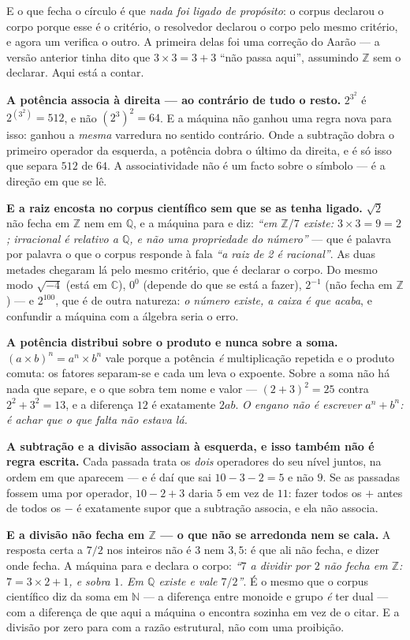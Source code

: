 \documentclass[11pt]{article}
\theoremstyle{plain}
\theoremstyle{remark}
\begin{document}
\begin{itemize}
E o que fecha o círculo é que \emph{nada foi ligado de propósito}: o corpus declarou o corpo
porque esse é o critério, o resolvedor declarou o corpo pelo mesmo critério, e agora um verifica o
outro. A primeira delas foi uma correção do Aarão --- a versão anterior tinha dito que $3\times3 = 3+3$ ``não
passa aqui'', assumindo $\mathbb{Z}$ sem o declarar. Aqui está a contar.

\textbf{A potência associa à direita --- ao contrário de tudo o resto.} $2^{3^2}$ é
$2^{(3^2)} = 512$, e não $(2^3)^2 = 64$. E a máquina não ganhou uma regra nova para isso: ganhou a
\emph{mesma} varredura no sentido contrário. Onde a subtração dobra o primeiro operador da
esquerda, a potência dobra o último da direita, e é só isso que separa $512$ de $64$. A
associatividade não é um facto sobre o símbolo --- é a direção em que se lê.

\textbf{E a raiz encosta no corpus científico sem que se as tenha ligado.} $\sqrt{2}$ não fecha em
$\mathbb{Z}$ nem em $\mathbb{Q}$, e a máquina para e diz: \emph{``em $\mathbb{Z}/7$ existe:
$3\times 3 = 9 = 2$; irracional é relativo a $\mathbb{Q}$, e não uma propriedade do número''} ---
que é palavra por palavra o que o corpus responde à fala \emph{``a raiz de 2 é racional''}. As
duas metades chegaram lá pelo mesmo critério, que é declarar o corpo. Do mesmo modo $\sqrt{-4}$
(está em $\mathbb{C}$), $0^0$ (depende do que se está a fazer), $2^{-1}$ (não fecha em
$\mathbb{Z}$) --- e $2^{100}$, que é de outra natureza: \emph{o número existe, a caixa é que
acaba}, e confundir a máquina com a álgebra seria o erro.

\textbf{A potência distribui sobre o produto e nunca sobre a soma.} $(a\times b)^n = a^n\times b^n$
vale porque a potência \emph{é} multiplicação repetida e o produto comuta: os fatores separam-se e
cada um leva o expoente. Sobre a soma não há nada que separe, e o que sobra tem nome e valor ---
$(2+3)^2 = 25$ contra $2^2+3^2 = 13$, e a diferença $12$ é exatamente $2ab$. \emph{O engano não é
escrever $a^n + b^n$: é achar que o que falta não estava lá.}

\textbf{A subtração e a divisão associam à esquerda, e isso também não é regra escrita.} Cada
passada trata os \emph{dois} operadores do seu nível juntos, na ordem em que aparecem --- e é daí
que sai $10-3-2 = 5$ e não $9$. Se as passadas fossem uma por operador, $10-2+3$ daria $5$ em vez
de $11$: fazer todos os $+$ antes de todos os $-$ é exatamente supor que a subtração associa, e ela
não associa.

\textbf{E a divisão não fecha em $\mathbb{Z}$ --- o que não se arredonda nem se cala.} A resposta
certa a $7/2$ nos inteiros não é $3$ nem $3{,}5$: é que ali não fecha, e dizer onde fecha. A
máquina para e declara o corpo: \emph{``$7$ a dividir por $2$ não fecha em $\mathbb{Z}$:
$7 = 3\times 2 + 1$, e sobra $1$. Em $\mathbb{Q}$ existe e vale $7/2$''}. É o mesmo que o corpus
científico diz da soma em $\mathbb{N}$ --- a diferença entre monoide e grupo \emph{é} ter dual ---
com a diferença de que aqui a máquina o encontra sozinha em vez de o citar. E a divisão por zero
para com a razão estrutural, não com uma proibição.


\end{itemize}
\end{document}
